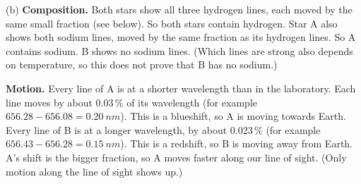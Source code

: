 \begin{practiceanswers}
\begin{practiceans}
  \begin{modelanswer}
  (b) \textbf{Composition.} Both stars show all three hydrogen lines, each moved by the same
  small fraction (see below). So both stars contain hydrogen. Star A also shows both sodium
  lines, moved by the same fraction as its hydrogen lines. So A contains sodium. B shows no
  sodium lines. (Which lines are strong also depends on temperature, so this does not prove
  that B has no sodium.)

  \textbf{Motion.} Every line of A is at a shorter wavelength than in the laboratory. Each line
  moves by about 0.03\,\% of its wavelength (for example $656.28 - 656.08 = \qty{0.20}{nm}$).
  This is a blueshift, so A is moving towards Earth. Every line of B is at a longer wavelength,
  by about 0.023\,\% (for example $656.43 - 656.28 = \qty{0.15}{nm}$). This is a redshift, so B
  is moving away from Earth. A's shift is the bigger fraction, so A moves faster along our line of sight.
  (Only motion along the line of sight shows up.)


\end{modelanswer}
\end{practiceans}
\end{practiceanswers}
